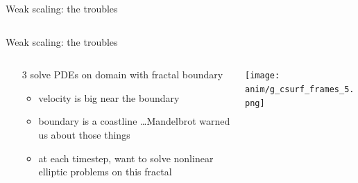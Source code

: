 \documentclass[intlimits]{beamer}
\begin{document}
\begin{frame}{Weak scaling: the troubles}
\begin{columns}
\begin{column}{0.5\textwidth}
\begin{center}
      \end{center}
\end{column}
\end{columns}
\end{frame}


\begin{frame}{Weak scaling: the troubles}
\begin{columns}
\begin{column}{0.45\textwidth}
  \begin{enumerate}
  \item[3] solve PDEs on domain with fractal boundary
    \begin{itemize}
    \item velocity is big near the boundary
    \item boundary is a \alert{coastline} \dots Mandelbrot warned us about those things
    \item at each timestep, want to solve nonlinear elliptic problems on this fractal
    \end{itemize}
  \end{enumerate}
\end{column}
\begin{column}{0.55\textwidth}
\vspace{-1cm}
      \begin{center}
        \texttt{[image: anim/g\_csurf\_frames\_5.png]}
      \end{center}
\end{column}
\end{columns}
\end{frame}


\section*{}

  {
} 
\end{document}
